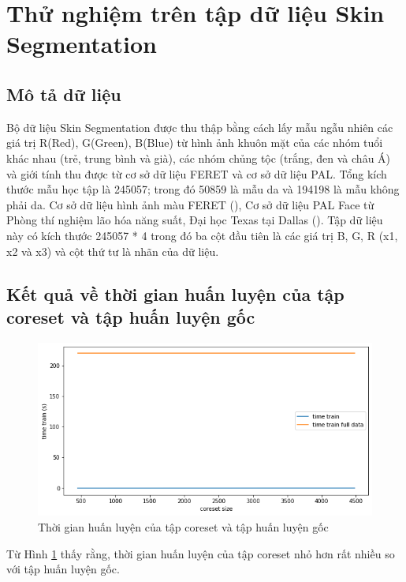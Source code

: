 \documentclass[a4paper, 12pt, oneside]{report}
\begin{document}
\section{Thử nghiệm trên tập dữ liệu Skin Segmentation}
\subsection{Mô tả dữ liệu}
Bộ dữ liệu Skin Segmentation được thu thập bằng cách lấy mẫu ngẫu nhiên các giá trị R(Red), G(Green), B(Blue) từ hình ảnh khuôn mặt của các nhóm tuổi khác nhau (trẻ, trung bình và già), các nhóm chủng tộc (trắng, đen và châu Á) và giới tính thu được từ cơ sở dữ liệu FERET và cơ sở dữ liệu PAL. Tổng kích thước mẫu học tập là 245057; trong đó 50859 là mẫu da và 194198 là mẫu không phải da. Cơ sở dữ liệu hình ảnh màu FERET (\cite {Color Database}), Cơ sở dữ liệu PAL Face từ Phòng thí nghiệm lão hóa năng suất, Đại học Texas tại Dallas (\cite{Face Database}). Tập dữ liệu này có kích thước 245057 * 4 trong đó ba cột đầu tiên là các giá trị B, G, R (x1, x2 và x3) và cột thứ tư là nhãn của dữ liệu.
\subsection{Kết quả về thời gian huấn luyện của tập coreset và tập huấn luyện gốc}
\begin{center}
    \begin{figure}[H]
    \begin{center}
     \includegraphics[scale=0.55]{time_train_skin.png}
    \end{center}
    \caption{Thời gian huấn luyện của tập coreset và tập huấn luyện gốc}
    \label{Hình 4.6}
    \end{figure}
\end{center}
Từ Hình \ref{Hình 4.6} thấy rằng, thời gian huấn luyện của tập coreset nhỏ hơn rất nhiều so với tập huấn luyện gốc.
\end{document}
